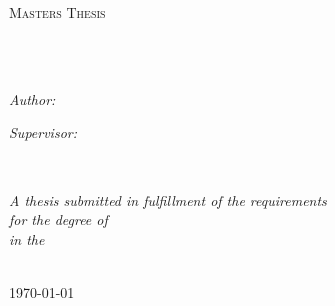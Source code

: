 \documentclass[
11pt, %
english, %
singlespacing, %
liststotoc, %
toctotoc, %
headsepline, %
chapterinoneline, %
]{MastersDoctoralThesis} %
\author{Bhishmaraj \textsc{S}} %
\begin{document}
\frontmatter %

\pagestyle{plain} %


\begin{titlepage}
  \begin{center}

    \vspace*{.06\textheight}
    {\scshape\LARGE \univname\par}\vspace{1.5cm} %
    \textsc{\Large Masters Thesis}\\[0.5cm] %

    \HRule \\[0.4cm] %
    {\huge \bfseries \ttitle\par}\vspace{0.4cm} %
    \HRule \\[1.5cm] %
    
    \begin{minipage}[t]{0.4\textwidth}
      \begin{flushleft} \large
        \emph{Author:}\\
        \href{http://www.johnsmith.com}{\authorname} %
      \end{flushleft}
    \end{minipage}
    \begin{minipage}[t]{0.4\textwidth}
      \begin{flushright} \large
        \emph{Supervisor:} \\
        \href{http://www.jamessmith.com}{\supname} %
      \end{flushright}
    \end{minipage}\\[3cm]
    
    \vfill

    \large \textit{A thesis submitted in fulfillment of the requirements\\ for the degree of \degreename}\\[0.3cm] %
    \textit{in the}\\[0.4cm]
    \deptname\\[2cm] %
    
    \vfill

    {\large \today}\\[4cm] %
    
    \vfill
  \end{center}
\end{titlepage}
\end{document}
